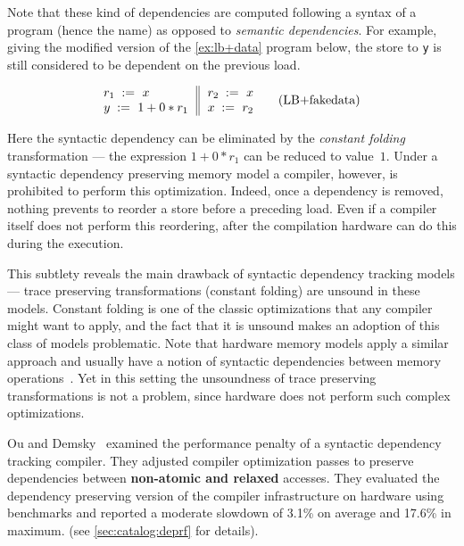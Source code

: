 Note that these kind of dependencies are computed following a 
syntax of a program (hence the name) as opposed 
to \emph{semantic dependencies}.
For example, giving the modified version of 
the \ref{ex:lb+data} program below, 
the store to \texttt{y} is still considered 
to be dependent on the previous load. 

\begin{equation*}
\inarrII{
  \readInst{}{r_1}{x}           \\
  \writeInst{}{y}{1 + 0 * r_1}  \\
}{
  \readInst{}{r_2}{x}      \\
  \writeInst{}{x}{r_2}     \\
}
\tag{LB+fakedata}\label{ex:lb+fakedata}
\end{equation*}

Here the syntactic dependency can be eliminated 
by the \emph{constant folding} transformation --- 
the expression $1 + 0 * r_1$ can be reduced to value~$1$.
Under a syntactic dependency preserving memory model 
a compiler, however, is prohibited to perform this optimization. 
Indeed, once a dependency is removed, nothing prevents 
to reorder a store before a preceding load. 
Even if a compiler itself does not perform this reordering,
after the compilation hardware can 
do this during the execution.   

This subtlety reveals the main drawback of 
syntactic dependency tracking models --- 
trace preserving transformations
(\eg constant folding) are unsound in these models. 
Constant folding is one of the classic optimizations 
that any compiler might want to apply, 
and the fact that it is unsound  
makes an adoption of this class of models problematic.
Note that hardware memory models apply a similar approach 
and usually have a notion of syntactic dependencies between 
memory operations~\cite{Sarkar-al:PLDI11, Alglave-al:TOPLAS14, Pulte-al:POPL18}.
Yet in this setting the unsoundness of 
trace preserving transformations is not a problem,
since hardware does not perform such complex optimizations.

Ou and Demsky~\cite{Ou-Demsky:OOPSLA18} examined
the performance penalty of a syntactic 
dependency tracking compiler.
They adjusted compiler optimization passes to preserve
dependencies between \textbf{non-atomic and relaxed} accesses.
They evaluated the dependency preserving 
version of the \LLVM compiler infrastructure 
on  hardware using \SPECCPU benchmarks
and reported a moderate slowdown of 
3.1\% on average and 17.6\% in maximum. 
(see \ref{sec:catalog:deprf} for details).

